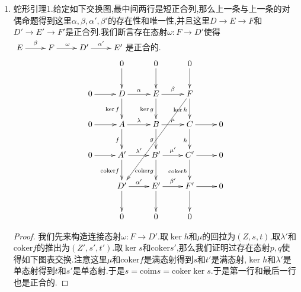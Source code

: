 \begin{enumerate}
\begin{proof}
    	首先按照图表交换性,得到$g\circ\lambda\circ\ker f=0$,于是按照$\ker g$的泛性质,$\lambda\circ\ker f$唯一的经$\ker g$分解,据此定义了唯一的态射$\alpha$使得图表交换.同理我们构造唯一的态射$\beta$使得图表交换.
    	
    	现在我们证明$\xymatrix{D\ar[r]^{\alpha}&E\ar[r]^{\beta}&F}$是正合的.我们解释过这需要验证两件事,其一是$\beta\circ\alpha=0$,但是按照图表交换性得到$\ker h\circ\beta\circ\alpha=\mu\circ\lambda\circ\ker f=0$,按照$\ker h$是单态射得到$\beta\circ\alpha=0$.第二件事是如果$E$的伪元素$e$满足$\beta(e)=0$,那么存在$D$的伪元素$d$使得$\alpha(d)\cong e$.图表交换性得到$\mu(\ker g(e))=0$,于是按照$A\to B\to C$是正合的说明存在$A$的伪元素$a$使得$\lambda(a)\cong\ker g(e)$,于是$\lambda'\circ f(a)=g\circ\lambda(a)\cong g\circ \ker g(e)=0$,按照$\lambda'$是单态射,得到$f(a)=0$,于是$a$经$\ker f$分解,也即存在$D$的伪元素$d$使得$a=\ker f\circ d$.那么$\ker g\circ\alpha(d)=\lambda\circ\ker f(d)=\lambda(a)\cong\ker g(e)$,按照$\ker g$是单态射,得到$\alpha(d)\cong e$.
    	
    	最后假设$\lambda$是单态射,需验验证$\alpha$是单态射.任取$D$的伪元素$d$使得$\alpha(d)=0$,那么$\lambda\circ\ker f(d)=0$,按照$\lambda$和$\ker f$都是单态射得到$d=0$,也即$\alpha$是单态射.
    \end{proof}
    \item 蛇形引理1.给定如下交换图,最中间两行是短正合列,那么上一条与上一条的对偶命题得到这里$\alpha,\beta,\alpha',\beta'$的存在性和唯一性,并且这里$D\to E\to F$和$D'\to E'\to F'$是正合列.我们断言存在态射$\omega:F\to D'$使得$\xymatrix{E\ar[r]^{\beta}&F\ar[r]^{\omega}&D'\ar[r]^{\alpha'}&E'}$是正合的.
   $$\xymatrix{&0\ar[d]&0\ar[d]&0\ar[d]&\\0\ar[r]&D\ar[r]^{\alpha}\ar[d]_{\ker f}&E\ar[r]^{\beta}\ar[d]_{\ker g}&F\ar[d]_{\ker h}\ar[dddll]&\\0\ar[r]&A\ar[r]^{\lambda}\ar[d]_f&B\ar[r]^{\mu}\ar[d]_g&C\ar[r]\ar[d]_h&0\\0\ar[r]&A'\ar[r]^{\lambda'}\ar[d]_{\mathrm{coker}f}&B'\ar[r]^{\mu'}\ar[d]_{\mathrm{coker}g}&C'\ar[d]_{\mathrm{coker}h}\ar[r]&0\\&D'\ar[r]^{\alpha'}\ar[d]&E'\ar[r]^{\beta'}\ar[d]&F'\ar[d]\ar[r]&0\\&0&0&0&}$$
    \begin{proof}
    	
    	我们先来构造连接态射$\omega:F\to D'$.取$\ker h$和$\mu$的回拉为$(Z,s,t)$,取$\lambda'$和$\mathrm{coker}f$的推出为$(Z',s',t')$.取$\ker s$和$\mathrm{coker}s'$,那么我们证明过存在态射$p,q$使得如下图表交换.注意这里$\mu$和$\mathrm{coker}f$是满态射得到$s$和$t'$是满态射,$\ker h$和$\lambda'$是单态射得到$t$和$s'$是单态射.于是$s=\mathrm{coim}s=\mathrm{coker}\ker s$.于是第一行和最后一行也是正合的.
    	

\end{proof}
\end{enumerate}
